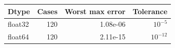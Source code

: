 \begin{tabular}{lrrr}
\toprule
Dtype & Cases & Worst max error & Tolerance \\
\midrule
float32 & 120 & 1.08e-06 & $10^{-5}$ \\
float64 & 120 & 2.11e-15 & $10^{-12}$ \\
\bottomrule
\end{tabular}
